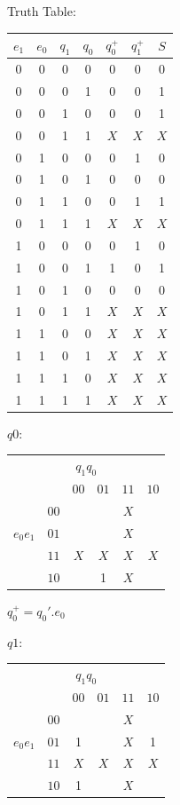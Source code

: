 \documentclass[11pt]{article}
\begin{document}
\begin{multicols}{2}

Truth Table: 
\begin{tabular}{|cc|cc|cc|c|}
\hline
$e_1$ & $e_0$ & $q_1$ & $q_0$ & $q^+_0$ & $q^+_1$ & $S$ \\
\hline
0 & 0 & 0 & 0   & 0 & 0 & 0 \\
0 & 0 & 0 & 1   & 0 & 0 & 1 \\
0 & 0 & 1 & 0   & 0 & 0 & 1 \\
0 & 0 & 1 & 1   & $X$ & $X$ & $X$ \\
\hline
0 & 1 & 0 & 0   & 0 & 1 & 0 \\
0 & 1 & 0 & 1   & 0 & 0 & 0 \\
0 & 1 & 1 & 0   & 0 & 1 & 1 \\
0 & 1 & 1 & 1   & $X$ & $X$ & $X$ \\
\hline
1 & 0 & 0 & 0   & 0 & 1 & 0 \\
1 & 0 & 0 & 1   & 1 & 0 & 1 \\
1 & 0 & 1 & 0   & 0 & 0 & 0 \\
1 & 0 & 1 & 1   & $X$ & $X$ & $X$ \\
\hline
1 & 1 & 0 & 0   & $X$ & $X$ & $X$ \\
1 & 1 & 0 & 1   & $X$ & $X$ & $X$ \\
1 & 1 & 1 & 0   & $X$ & $X$ & $X$ \\  
1 & 1 & 1 & 1   & $X$ & $X$ & $X$ \\
\hline
\end{tabular}

$q0$: 
\begin{tabular}{|cc|c|c|c|c|}
\hline
\multicolumn{6}{|c|}{$q_1 q_0$ } \\
           & & \tiny{$00$} & \tiny{$01$}  & \tiny{$11$}  & \tiny{$10$}  \\
           & \tiny{$00$} &   &   & $X$ &   \\
$e_0 e_1$  & \tiny{$01$} &   &   & $X$ &   \\
           & \tiny{$11$} & $X$ & $X$ & $X$ & $X$ \\
           & \tiny{$10$} &   & 1 & $X$ &   \\
\hline
\end{tabular}

$q_0^+ = q_0'. e_0$

$q1$: 
\begin{tabular}{|cc|c|c|c|c|}
\hline
\multicolumn{6}{|c|}{$q_1 q_0$ } \\
           & & \tiny{$00$} & \tiny{$01$}  & \tiny{$11$}  & \tiny{$10$}  \\
           & \tiny{$00$} &   &   & $X$ &   \\
$e_0 e_1$  & \tiny{$01$} & 1 &   & $X$ & 1 \\
           & \tiny{$11$} & $X$ & $X$ & $X$ & $X$ \\
           & \tiny{$10$} & 1 &   & $X$ &   \\
\hline
\end{tabular}



\end{multicols}
\end{document}

